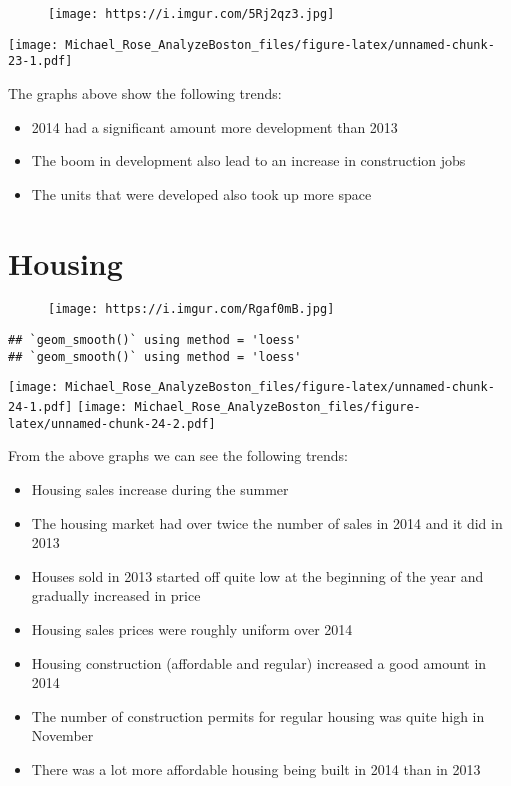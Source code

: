 \documentclass[]{article}
\providecommand{\tightlist}{%
  \setlength{\itemsep}{0pt}\setlength{\parskip}{0pt}}
\begin{document}
\begin{figure}
\centering
\texttt{[image: https://i.imgur.com/5Rj2qz3.jpg]}
\caption{}
\end{figure}

\texttt{[image: Michael\_Rose\_AnalyzeBoston\_files/figure-latex/unnamed-chunk-23-1.pdf]}

The graphs above show the following trends:

\begin{itemize}
\tightlist
\item
  2014 had a significant amount more development than 2013
\item
  The boom in development also lead to an increase in construction jobs
\item
  The units that were developed also took up more space
\end{itemize}

\newpage

\section{Housing}\label{housing}

\begin{figure}
\centering
\texttt{[image: https://i.imgur.com/Rgaf0mB.jpg]}
\caption{}
\end{figure}

\begin{verbatim}
## `geom_smooth()` using method = 'loess'
## `geom_smooth()` using method = 'loess'
\end{verbatim}

\texttt{[image: Michael\_Rose\_AnalyzeBoston\_files/figure-latex/unnamed-chunk-24-1.pdf]}
\texttt{[image: Michael\_Rose\_AnalyzeBoston\_files/figure-latex/unnamed-chunk-24-2.pdf]}

From the above graphs we can see the following trends:

\begin{itemize}
\tightlist
\item
  Housing sales increase during the summer
\item
  The housing market had over twice the number of sales in 2014 and it
  did in 2013
\item
  Houses sold in 2013 started off quite low at the beginning of the year
  and gradually increased in price
\item
  Housing sales prices were roughly uniform over 2014
\item
  Housing construction (affordable and regular) increased a good amount
  in 2014
\item
  The number of construction permits for regular housing was quite high
  in November
\item
  There was a lot more affordable housing being built in 2014 than in
  2013
\end{itemize}
\end{document}
